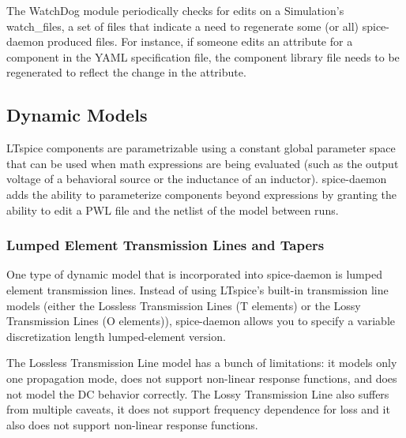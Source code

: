 \documentclass{article}
\newcommand{\cf}[1]{\textsf{#1}}
\begin{document}
The \cf{WatchDog} module periodically checks for edits on a \cf{Simulation}'s \cf{watch\_files},
a set of files that indicate a need to regenerate some (or all) spice-daemon produced files.
For instance, if someone edits an attribute for a component in the YAML specification file, 
the component library file needs to be regenerated to reflect the change in the attribute.




\subsection{Dynamic Models}

LTspice components are parametrizable using a constant global parameter space that can be used when
math expressions are being evaluated (such as the output voltage of a behavioral source or the inductance 
of an inductor). spice-daemon adds the ability to parameterize components beyond expressions by granting the
ability to edit a PWL file and the netlist of the model between runs.

\subsubsection{Lumped Element Transmission Lines and Tapers}

One type of dynamic model that is incorporated into spice-daemon is lumped 
element transmission lines. Instead of using LTspice's built-in transmission
line models (either the Lossless Transmission Lines (T elements) or the 
Lossy Transmission Lines (O elements)), spice-daemon allows you to specify a
variable discretization length lumped-element version. 

The Lossless Transmission Line model has a bunch of limitations: it models only one propagation mode,
 does not support non-linear response functions, and does not 
model the DC behavior correctly. The Lossy Transmission Line also suffers from multiple caveats,
it does not support frequency dependence for loss and it also does not support non-linear response 
functions. %
\end{document}
